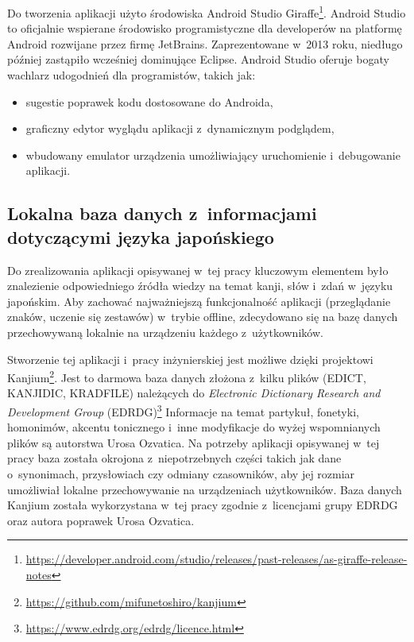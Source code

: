 \documentclass[a4paper,twoside,12pt]{book}
\newcommand{\obcy}[1]{\emph{#1}}
\newcommand{\english}[1]{{\selectlanguage{british}\obcy{#1}}}
\begin{document}
Do tworzenia aplikacji użyto środowiska Android Studio Giraffe\footnote{\url{https://developer.android.com/studio/releases/past-releases/as-giraffe-release-notes}}. Android Studio to oficjalnie wspierane środowisko programistyczne dla developerów na platformę Android rozwijane przez firmę JetBrains. Zaprezentowane w~2013 roku, niedługo później zastąpiło wcześniej dominujące Eclipse. Android Studio oferuje bogaty wachlarz udogodnień dla programistów, takich jak:
\begin{itemize}
\item sugestie poprawek kodu dostosowane do Androida,
\item graficzny edytor wyglądu aplikacji z~dynamicznym podglądem,
\item wbudowany emulator urządzenia umożliwiający uruchomienie i~debugowanie aplikacji.
\end{itemize}
 
\subsection{Lokalna baza danych z~informacjami dotyczącymi języka japońskiego}

Do zrealizowania aplikacji opisywanej w~tej pracy kluczowym elementem było znalezienie odpowiedniego źródła wiedzy na temat kanji, słów i~zdań w~języku japońskim. Aby zachować najważniejszą funkcjonalność aplikacji (przeglądanie znaków, uczenie się zestawów) w~trybie offline, zdecydowano się na bazę danych przechowywaną lokalnie na urządzeniu każdego z~użytkowników. 

Stworzenie tej aplikacji i~pracy inżynierskiej jest możliwe dzięki projektowi Kanjium\footnote{\url{https://github.com/mifunetoshiro/kanjium}}. Jest to darmowa baza danych złożona z~kilku plików (EDICT, KANJIDIC, KRADFILE) należących do  \english{Electronic Dictionary Research and Development Group} (EDRDG)\footnote{\url{https://www.edrdg.org/edrdg/licence.html}} Informacje na temat partykuł, fonetyki, homonimów, akcentu tonicznego i~inne modyfikacje do wyżej wspomnianych plików są autorstwa Urosa Ozvatica. Na potrzeby aplikacji opisywanej w~tej pracy baza została okrojona z~niepotrzebnych części takich jak dane o~synonimach, przysłowiach czy odmiany czasowników, aby jej rozmiar umożliwiał lokalne przechowywanie na urządzeniach użytkowników. Baza danych Kanjium została wykorzystana w~tej pracy zgodnie z~licencjami grupy EDRDG oraz autora poprawek Urosa Ozvatica.
\end{document}
